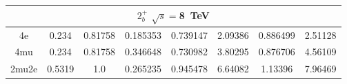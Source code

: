 \begin{table}[b]
\begin{tabular}{c c c c c c c c}
 \multicolumn{8}{|c|}{$2^{+}_{b}$ $\sqrt{s}=$8~TeV} \\ \hline 

4e & 0.234 & 0.81758 & 0.185353 & 0.739147
 & 2.09386%
 & 0.886499 & 2.51128 \\ \hline 
4mu & 0.234 & 0.81758 & 0.346648 & 0.730982
 & 3.80295%
 & 0.876706 & 4.56109 \\ \hline 
2mu2e & 0.5319 & 1.0  & 0.265235 & 0.945478
 & 6.64082%
 & 1.13396 & 7.96469 \\ \hline \hline 
\end{tabular}
\label{table:HZZ4lyieldcorr_spin2_min}
\end{table}



